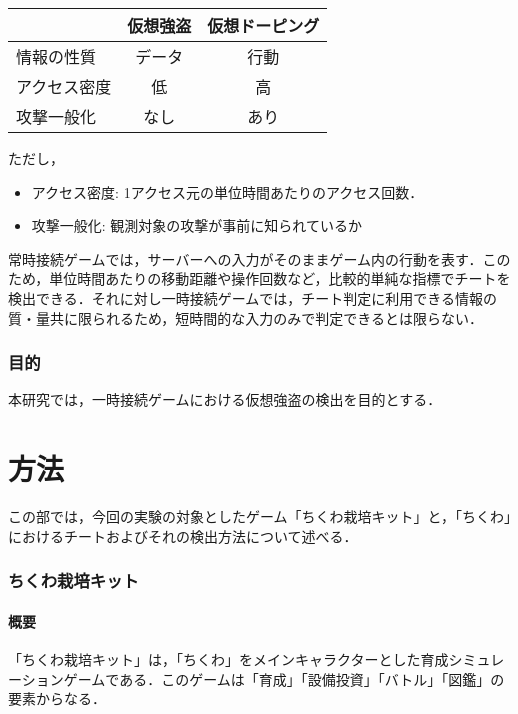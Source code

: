 \documentclass[a4paper,11pt]{jsarticle}
\begin{document}
\begin{center}
\begin{tabular}{l|cc}
& 仮想強盗 & 仮想ドーピング \\ \hline
情報の性質 & データ & 行動 \\
アクセス密度 & 低 & 高 \\
攻撃一般化 & なし & あり \\
\end{tabular}
\end{center}

ただし，

\begin{itemize}
\item
アクセス密度: 1アクセス元の単位時間あたりのアクセス回数．
\item
攻撃一般化: 観測対象の攻撃が事前に知られているか
\end{itemize}

常時接続ゲームでは，サーバーへの入力がそのままゲーム内の行動を表す．このため，単位時間あたりの移動距離や操作回数など，比較的単純な指標でチートを検出できる\cite{botcraft}．それに対し一時接続ゲームでは，チート判定に利用できる情報の質・量共に限られるため，短時間的な入力のみで判定できるとは限らない．

\section{目的}
本研究では，一時接続ゲームにおける仮想強盗の検出を目的とする．

\newpage %


\part{方法}
この部では，今回の実験の対象としたゲーム「ちくわ栽培キット」と，「ちくわ」におけるチートおよびそれの検出方法について述べる．

\section{ちくわ栽培キット}
\subsection{概要}
「ちくわ栽培キット」は，「ちくわ」をメインキャラクターとした育成シミュレーションゲームである．このゲームは「育成」「設備投資」「バトル」「図鑑」の要素からなる．
\end{document}
